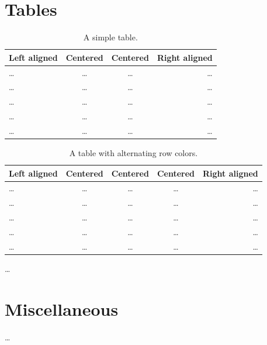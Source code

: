 \section{Tables}
\label{app:how-to:tables}

\begin{table}
  \centering
  \sffamily
  \begin{tabular}{lccr}
    \toprule
    Left aligned  & Centered & Centered & Right aligned\\
    \midrule
    \ldots & \ldots   & \ldots   & \ldots \\
    \ldots & \ldots   & \ldots   & \ldots \\
    \ldots & \ldots   & \ldots   & \ldots \\
    \ldots & \ldots   & \ldots   & \ldots \\
    \ldots & \ldots   & \ldots   & \ldots \\
    \bottomrule
  \end{tabular}
  \caption[A simple table]{A simple table.}
  \label{tab:how-to:tables:example1}
\end{table}
\begin{table}
  \centering
  \sffamily
  \begin{tabular}{lcccr}
    \toprule
    Left aligned  & Centered & Centered & Centered & Right aligned\\
    \midrule
    \ldots & \ldots   & \ldots   & \ldots   & \ldots \\
    \ldots & \ldots   & \ldots   & \ldots   & \ldots \\
    \ldots & \ldots   & \ldots   & \ldots   & \ldots \\
    \ldots & \ldots   & \ldots   & \ldots   & \ldots \\
    \ldots & \ldots   & \ldots   & \ldots   & \ldots \\
    \bottomrule
  \end{tabular}
  \caption[Alternating row-color table]{A table with alternating row colors.}
  \label{tab:how-to:tables:example2}
\end{table}
\ldots
\par

\section{Miscellaneous}
\label{app:how-to:miscellaneous}

\ldots
\par

